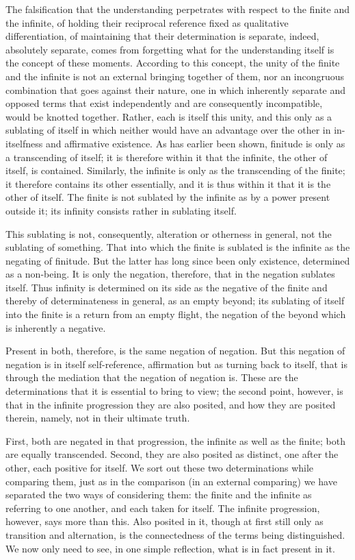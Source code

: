 The falsification that the understanding perpetrates
with respect to the finite and the infinite,
of holding their reciprocal reference fixed
as qualitative differentiation,
of maintaining that their determination is separate,
indeed, absolutely separate, comes from forgetting
what for the understanding itself is the concept of these moments.
According to this concept, the unity of the finite and the infinite
is not an external bringing together of them,
nor an incongruous combination that goes against their nature,
one in which inherently separate and opposed terms
that exist independently and are consequently incompatible,
would be knotted together.
Rather, each is itself this unity,
and this only as a sublating of itself
in which neither would have an advantage
over the other in in-itselfness and affirmative existence.
As has earlier been shown, finitude is only as a transcending of itself;
it is therefore within it that the infinite,
the other of itself, is contained.
Similarly, the infinite is only as the transcending of the finite;
it therefore contains its other essentially,
and it is thus within it that it is the other of itself.
The finite is not sublated by the infinite
as by a power present outside it;
its infinity consists rather in sublating itself.

This sublating is not, consequently,
alteration or otherness in general,
not the sublating of something.
That into which the finite is sublated is
the infinite as the negating of finitude.
But the latter has long since been only existence,
determined as a non-being.
It is only the negation, therefore,
that in the negation sublates itself.
Thus infinity is determined on its side
as the negative of the finite
and thereby of determinateness in general,
as an empty beyond;
its sublating of itself into the finite is
a return from an empty flight,
the negation of the beyond
which is inherently a negative.

Present in both, therefore, is the same negation of negation.
But this negation of negation is in itself self-reference,
affirmation but as turning back to itself, that is
through the mediation that the negation of negation is.
These are the determinations that it is essential to bring to view;
the second point, however, is that in the infinite progression
they are also posited, and how they are posited therein,
namely, not in their ultimate truth.

First, both are negated in that progression,
the infinite as well as the finite;
both are equally transcended.
Second, they are also posited as distinct,
one after the other, each positive for itself.
We sort out these two determinations
while comparing them, just as in the comparison (in an external comparing)
we have separated the two ways of considering them:
the finite and the infinite as referring to one another,
and each taken for itself.
The infinite progression, however, says more than this.
Also posited in it, though at first still only
as transition and alternation,
is the connectedness of the terms being distinguished.
We now only need to see, in one simple reflection,
what is in fact present in it.

